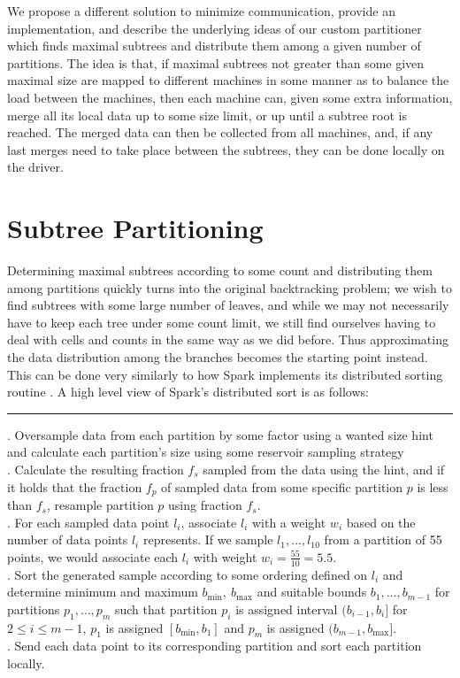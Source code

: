 \documentclass{report}
\begin{document}
We propose a different solution to minimize communication, provide an implementation, and describe the underlying ideas of our custom
partitioner which finds maximal subtrees and distribute them among a given number of partitions. %
The idea is that, if maximal subtrees not greater than some given maximal size are mapped to different machines in some manner as to
balance the load between the machines, then each machine can, given some extra information, merge all its local data up to some size limit, or up until a subtree root is reached. 
The merged data can then be collected from all machines, and, if any last merges need to take place between the subtrees, they can be done locally on the driver.

\section{Subtree Partitioning}
    \label{SubtreePartitioning}
Determining maximal subtrees according to some count and distributing them among partitions quickly turns into the original backtracking problem; we wish to find subtrees with some large number of leaves, and while we
may not necessarily have to keep each tree under some count limit, we still find ourselves having to deal with cells and counts in the same way as we did before. 
Thus approximating the data distribution among the branches becomes the starting point instead. This can be done very similarly to how Spark implements its distributed sorting routine 
\cite{spark sort}. A high level view of Spark's distributed sort 
is as follows:\\
\noindent\rule{\textwidth}{1.0pt}
. Oversample data from each partition by some factor using a wanted size hint and calculate each partition's size using some reservoir sampling strategy\\
. Calculate the resulting fraction $f_s$ sampled from the data using the hint, and if it holds that the fraction $f_p$ of sampled data from some specific partition $p$ is less than $f_s$, resample
	partition $p$ using fraction $f_s$.\\
. For each sampled data point $l_i$, associate $l_i$ with a weight $w_i$ based on the number of data points $l_i$ represents. If we sample $l_1, \dots, l_{10}$ from a partition of 55 points,
	we would associate each $l_i$ with  weight $w_i = \frac{55}{10} = 5.5$.\\
. Sort the generated sample according to some ordering defined on $l_i$ and determine minimum and maximum $b_{\text{min}},\ b_{\text{max}}$
and suitable bounds $b_1,\dots,b_{m-1}$ for partitions $p_1,\dots,p_m$ such that partition $p_i$ is assigned interval 
$(b_{i-1}, b_{i}]$ for $2\leq i \leq m-1$, $p_1$ is assigned $[b_{\text{min}},b_1]$ and $p_m$ is assigned $(b_{m-1}, b_{\text{max}}]$.\\
. Send each data point to its corresponding partition and sort each partition locally.
\end{document}
